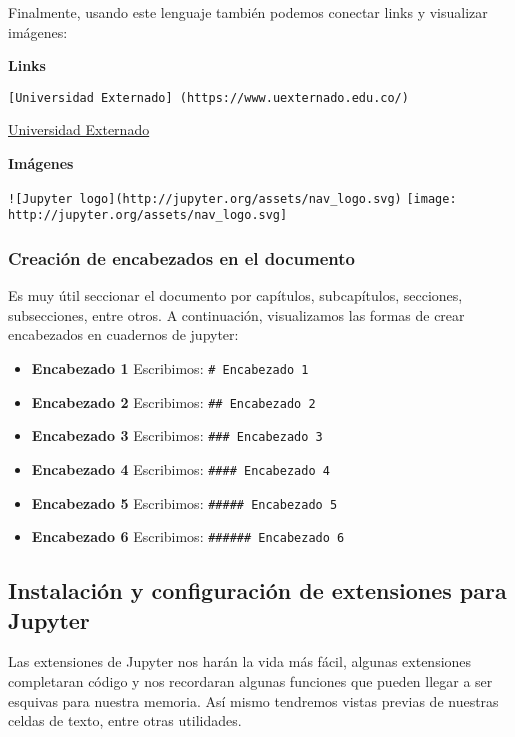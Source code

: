 \documentclass[11pt]{article}
\begin{document}
Finalmente, usando este lenguaje también podemos conectar links y
visualizar imágenes:

\textbf{Links}

\texttt{{[}Universidad\ Externado{]}\ (https://www.uexternado.edu.co/)}

\href{https://www.uexternado.edu.co/}{Universidad Externado}

\textbf{Imágenes}

\texttt{!{[}Jupyter\ logo{]}(http://jupyter.org/assets/nav\_logo.svg)}
\texttt{[image: http://jupyter.org/assets/nav\_logo.svg]}

    \hypertarget{creaciuxf3n-de-encabezados-en-el-documento}{%
\subsubsection{Creación de encabezados en el
documento}\label{creaciuxf3n-de-encabezados-en-el-documento}}

Es muy útil seccionar el documento por capítulos, subcapítulos,
secciones, subsecciones, entre otros. A continuación, visualizamos las
formas de crear encabezados en cuadernos de jupyter:

\begin{itemize}
\item
  \textbf{Encabezado 1} Escribimos: \texttt{\#\ Encabezado\ 1}
\item
  \textbf{Encabezado 2} Escribimos: \texttt{\#\#\ Encabezado\ 2}
\item
  \textbf{Encabezado 3} Escribimos: \texttt{\#\#\#\ Encabezado\ 3}
\item
  \textbf{Encabezado 4} Escribimos: \texttt{\#\#\#\#\ Encabezado\ 4}
\item
  \textbf{Encabezado 5} Escribimos: \texttt{\#\#\#\#\#\ Encabezado\ 5}
\item
  \textbf{Encabezado 6} Escribimos: \texttt{\#\#\#\#\#\#\ Encabezado\ 6}
\end{itemize}

    \hypertarget{instalaciuxf3n-y-configuraciuxf3n-de-extensiones-para-jupyter}{%
\subsection{Instalación y configuración de extensiones para
Jupyter}\label{instalaciuxf3n-y-configuraciuxf3n-de-extensiones-para-jupyter}}

Las extensiones de Jupyter nos harán la vida más fácil, algunas
extensiones completaran código y nos recordaran algunas funciones que
pueden llegar a ser esquivas para nuestra memoria. Así mismo tendremos
vistas previas de nuestras celdas de texto, entre otras utilidades.
\end{document}
